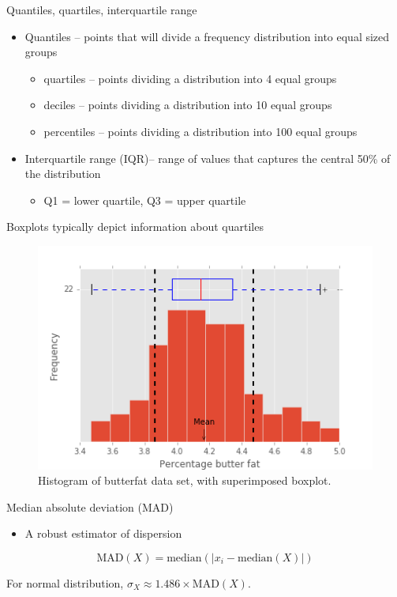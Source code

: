 \documentclass[presentation]{beamer}
\begin{document}
\begin{frame}[label={sec:orgheadline21}]{Quantiles, quartiles, interquartile range}
\begin{itemize}
\item \alert{Quantiles} -- points that will divide a frequency distribution into equal sized groups
\begin{itemize}
\item quartiles -- points dividing a distribution into 4 equal groups
\item deciles -- points dividing a distribution into 10 equal groups
\item percentiles -- points dividing a distribution into 100 equal groups
\end{itemize}
\item \alert{Interquartile range (IQR)}-- range of values that captures the central 50\% of the distribution 
\begin{itemize}
\item Q1 = lower quartile, Q3 = upper quartile
\end{itemize}
\end{itemize}
\end{frame}


\begin{frame}[label={sec:orgheadline22}]{Boxplots typically depict information about quartiles}
\begin{figure}[htb]
\centering
\includegraphics[width=.9\linewidth]{butterfat-hist-boxplot.png}
\caption{Histogram of butterfat data set, with superimposed boxplot.}
\end{figure}
\end{frame}



\begin{frame}[label={sec:orgheadline23}]{Median absolute deviation (MAD)}
\begin{itemize}
\item A robust estimator of dispersion
\end{itemize}

\[
\mathrm{MAD}(X) = \mathrm{median}(|x_i - \mathrm{median}(X)|) 
\]

For normal distribution, \(\sigma_X \approx 1.486 \times \mathrm{MAD}(X)\). 
\end{frame}
\end{document}
